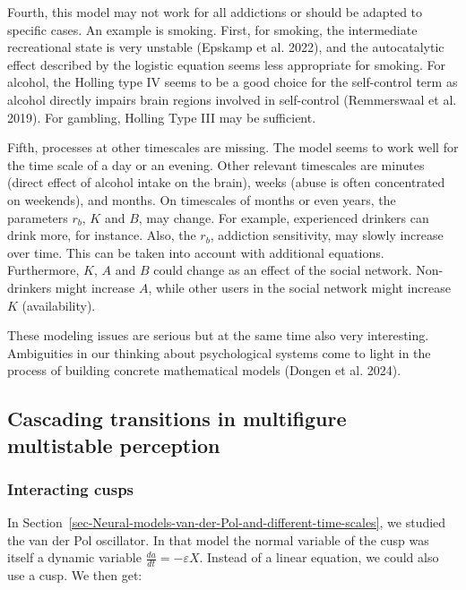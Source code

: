 \documentclass[
  a4paper,
  DIV=11,
  numbers=noendperiod,
  oneside]{scrreprt}
\begin{document}
Fourth, this model may not work for all addictions or should be adapted
to specific cases. An example is smoking. First, for smoking, the
intermediate recreational state is very unstable (Epskamp et al. 2022),
and the autocatalytic effect described by the logistic equation seems
less appropriate for smoking. For alcohol, the Holling type IV seems to
be a good choice for the self-control term as alcohol directly impairs
brain regions involved in self-control (Remmerswaal et al. 2019). For
gambling, Holling Type III may be sufficient.

Fifth, processes at other timescales are missing. The model seems to
work well for the time scale of a day or an evening. Other relevant
timescales are minutes (direct effect of alcohol intake on the brain),
weeks (abuse is often concentrated on weekends), and months. On
timescales of months or even years, the parameters \(r_{b}\), \(K\) and
\(B\), may change. For example, experienced drinkers can drink more, for
instance. Also, the \(r_{b}\), addiction sensitivity, may slowly
increase over time. This can be taken into account with additional
equations. Furthermore, \(K\), \(A\) and \(B\) could change as an effect
of the social network. Non-drinkers might increase \(A\), while other
users in the social network might increase \(K\) (availability).

These modeling issues are serious but at the same time also very
interesting. Ambiguities in our thinking about psychological systems
come to light in the process of building concrete mathematical models
(Dongen et al. 2024).

\hypertarget{sec-Cascading-transitions-in-multifigure-multistable-perception}{%
\subsection{Cascading transitions in multifigure multistable
perception}\label{sec-Cascading-transitions-in-multifigure-multistable-perception}}

\hypertarget{sec-Interacting-cusps}{%
\subsubsection{Interacting cusps}\label{sec-Interacting-cusps}}

In
Section~\ref{sec-Neural-models-van-der-Pol-and-different-time-scales},
we studied the van der Pol oscillator. In that model the normal variable
of the cusp was itself a dynamic variable
\(\frac{da}{dt}= - \varepsilon X\). Instead of a linear equation, we
could also use a cusp. We then get:
\end{document}
